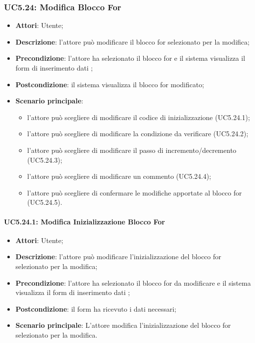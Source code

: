 \subsubsection{UC5.24: Modifica Blocco For}
\label{UC5.24}
\begin{itemize}
\item \textbf{Attori}: Utente;
\item \textbf{Descrizione}: l'attore può modificare il blocco for selezionato per la modifica;
\item \textbf{Precondizione}: l'attore ha selezionato il blocco for e il sistema visualizza il form di inserimento dati ;	
\item \textbf{Postcondizione}: il sistema visualizza il blocco for modificato;	
\item \textbf{Scenario principale}:
\begin{itemize}
\item l'attore può scegliere di modificare il codice di inizializzazione (UC5.24.1);
\item l'attore può scegliere di modificare la condizione da verificare (UC5.24.2);
\item l'attore può scegliere di modificare il passo di incremento/decremento (UC5.24.3);
\item l'attore può scegliere di modificare un commento (UC5.24.4);
\item l'attore può scegliere di confermare le modifiche apportate al blocco for (UC5.24.5).
\end{itemize}
\end{itemize}
\paragraph{UC5.24.1: Modifica Inizializzazione Blocco For}
\label{UC5.24.1}
\begin{itemize}
\item \textbf{Attori}: Utente;
\item \textbf{Descrizione}: l'attore può modificare l'inizializzazione del blocco for selezionato per la modifica;
\item \textbf{Precondizione}: l'attore ha selezionato il blocco for da modificare e il sistema visualizza il form di inserimento dati ;	
\item \textbf{Postcondizione}: il form ha ricevuto i dati necessari;	
\item \textbf{Scenario principale}:
L'attore modifica l'inizializzazione del blocco for selezionato per la modifica.
\end{itemize}
